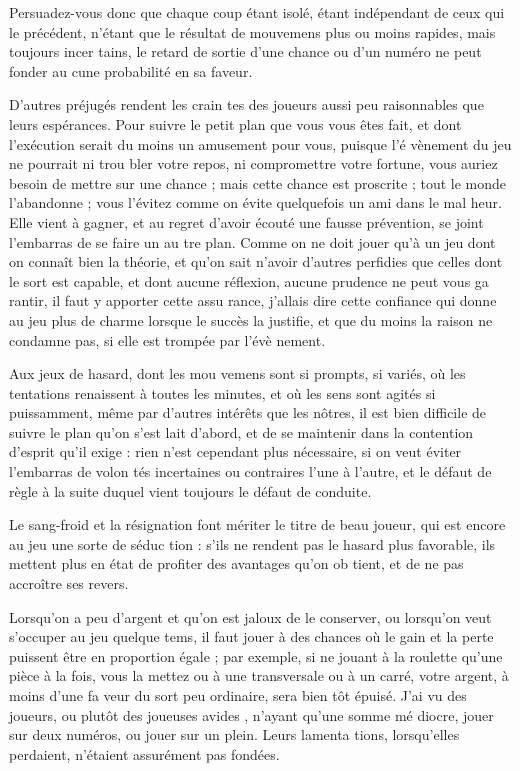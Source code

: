 Persuadez-vous donc que chaque
coup étant isolé, étant indépendant
de ceux qui le précédent, n'étant que
le résultat de mouvemens plus ou
moins rapides, mais toujours incer%
tains, le retard de sortie d'une chance
ou d'un numéro ne peut fonder au%
cune probabilité en sa faveur.

D'autres préjugés rendent les crain%
tes des joueurs aussi peu raisonnables
que leurs espérances. Pour suivre le
petit plan que vous vous êtes fait, et
dont l'exécution serait du moins un
amusement pour vous, puisque l'é%
vènement du jeu ne pourrait ni trou%
bler votre repos, ni compromettre
votre fortune, vous auriez besoin de
mettre sur une chance ; mais cette
chance est proscrite ; tout le monde
l'abandonne ; vous l'évitez comme on
évite quelquefois un ami dans le mal%
heur. Elle vient à gagner, et au regret
d'avoir écouté une fausse prévention,
se joint l'embarras de se faire un au%
tre plan. Comme on ne doit jouer
qu'à un jeu dont on connaît bien la
théorie, et qu'on sait n'avoir d'autres
perfidies que celles dont le sort est
capable, et dont aucune réflexion,
aucune prudence ne peut vous ga%
rantir, il faut y apporter cette assu%
rance, j'allais dire cette confiance
qui donne au jeu plus de charme
lorsque le succès la justifie, et que
du moins la raison ne condamne
pas, si elle est trompée par l'évè%
nement.

Aux jeux de hasard, dont les mou%
vemens sont si prompts, si variés,
où les tentations renaissent à toutes
les minutes, et où les sens sont agités
si puissamment, même par d'autres
intérêts que les nôtres, il est bien
difficile de suivre le plan qu'on s'est
lait d'abord, et de se maintenir dans la
contention d'esprit qu'il exige : rien
n'est cependant plus nécessaire, si
on veut éviter l'embarras de volon%
tés incertaines ou contraires l'une à
l'autre, et le défaut de règle à la suite
duquel vient toujours le défaut de
conduite.

Le sang-froid et la résignation font
mériter le titre de beau joueur, qui
est encore au jeu une sorte de séduc%
tion : s'ils ne rendent pas le hasard
plus favorable, ils mettent plus en
état de profiter des avantages qu'on ob%
tient, et de ne pas accroître ses revers.

Lorsqu'on a peu d'argent et qu'on est
jaloux de le conserver, ou lorsqu'on
veut s'occuper au jeu quelque tems,
il faut jouer à des chances où le gain
et la perte puissent être en proportion
égale ; par exemple, si ne jouant à la
roulette qu'une pièce à la fois, vous la
mettez ou à une transversale ou à un
carré, votre argent, à moins d'une fa%
veur du sort peu ordinaire, sera bien%
tôt épuisé. J'ai vu des joueurs, ou
plutôt des joueuses avides , n'ayant qu'une somme mé%
diocre, jouer sur deux numéros, ou
jouer sur un plein. Leurs lamenta%
tions, lorsqu'elles perdaient, n'étaient
assurément pas fondées.

